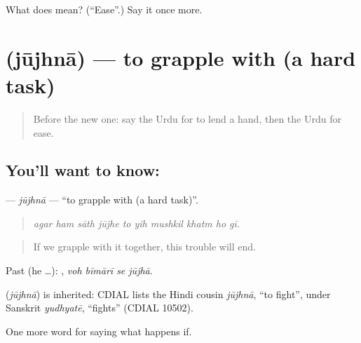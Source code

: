 \begin{tcolorbox}[breakable,colback=teal!4,colframe=teal!35!black,title={Before you move on}]
What does  mean? (\textquotedblleft{}Ease\textquotedblright{}.) Say it once more.
\end{tcolorbox}
\section[\texorpdfstring{\ur{جوجھنا} (jūjhnā)}{جوجھنا (jūjhnā)}]{ (jūjhnā) — to grapple with (a hard task)}

\label{lesson:UR-C546-jujhna}



\begin{quote}
Before the new one: say the Urdu for to lend a hand, then the Urdu for ease.
\end{quote}

\subsection*{You'll want to know: }
\textbf{} — \emph{jūjhnā} — \textquotedblleft{}to grapple with (a hard task)\textquotedblright{}.

\begin{quote}
         
\end{quote}

\begin{quote}
\emph{agar ham sāth jūjhe to yih mushkil khatm ho gī.}
\end{quote}

\begin{quote}
If we grapple with it together, this trouble will end.
\end{quote}

Past (he …):    , \emph{voh bīmārī se jūjhā}.

\begin{cousinweb}
\textbf{} (\emph{jūjhnā}) is inherited: CDIAL lists the Hindi cousin \emph{jūjhnā}, \textquotedblleft{}to fight\textquotedblright{}, under Sanskrit \emph{yudhyatē}, \textquotedblleft{}fights\textquotedblright{} (CDIAL 10502).
\end{cousinweb}

\begin{grammarlens}[title={What you've built}]
One more word for saying what happens if.
\end{grammarlens}

